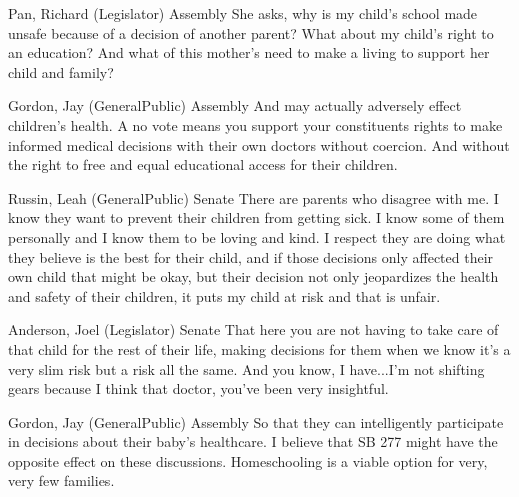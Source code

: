 \begin{result}{15.03620730889844}{Pan, Richard (Legislator) Assembly}
She asks, why is my child's school made unsafe because of a decision of another parent? What about my child's right to an education? And what of this mother's need to make a living to support her child and family?
\end{result}

\begin{result}{14.527732171017536}{Gordon, Jay (GeneralPublic) Assembly}
And may actually adversely effect children's health. A no vote means you support your constituents rights to make informed medical decisions with their own doctors without coercion. And without the right to free and equal educational access for their children.
\end{result}

\begin{result}{14.1432066442995}{Russin, Leah (GeneralPublic) Senate}
There are parents who disagree with me. I know they want to prevent their children from getting sick. I know some of them personally and I know them to be loving and kind. I respect they are doing what they believe is the best for their child, and if those decisions only affected their own child that might be okay, but their decision not only jeopardizes the health and safety of their children, it puts my child at risk and that is unfair.
\end{result}

\begin{result}{12.773276729732682}{Anderson, Joel (Legislator) Senate}
That here you are not having to take care of that child for the rest of their life, making decisions for them when we know it's a very slim risk but a risk all the same. And you know, I have...I'm not shifting gears because I think that doctor, you've been very insightful.
\end{result}

\begin{result}{12.361160896976774}{Gordon, Jay (GeneralPublic) Assembly}
So that they can intelligently participate in decisions about their baby's healthcare. I believe that SB 277 might have the opposite effect on these discussions. Homeschooling is a viable option for very, very few families.
\end{result}

